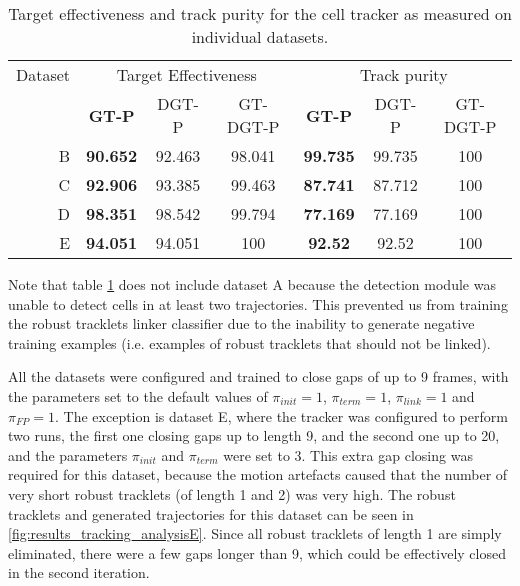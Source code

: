 		\begin{table}[h]
			\centering
			\begin{tabular}{r*{3}{c}*{3}{c}}
				Dataset & \multicolumn{3}{c}{Target Effectiveness} &  \multicolumn{3}{c}{Track purity}   \\
				        &  \textbf{GT-P}  & DGT-P  &   GT-DGT-P    &  \textbf{GT-P}  & DGT-P  & GT-DGT-P \\
			\hline
				      B & \textbf{90.652} & 92.463 &    98.041     & \textbf{99.735} & 99.735 &   100    \\
				      C & \textbf{92.906} & 93.385 &    99.463     & \textbf{87.741} & 87.712 &   100    \\
				      D & \textbf{98.351} & 98.542 &    99.794     & \textbf{77.169} & 77.169 &   100    \\
				      E & \textbf{94.051} & 94.051 &      100      & \textbf{ 92.52} & 92.52  &   100
			\end{tabular} 
			\caption{Target effectiveness and track purity for the cell tracker as measured on individual datasets.}
			\label{tab:results_tracker_individual}
		\end{table}
		
		Note that table \cref{tab:results_tracker_individual} does not include dataset A because the detection module was unable to detect cells in at least two trajectories. This prevented us from training the robust tracklets linker classifier due to the inability to generate negative training examples (i.e. examples of robust tracklets that should not be linked).
		
		All the datasets were configured and trained to close gaps of up to 9 frames, with the parameters set to the default values of $\pi_{init}=1$, $\pi_{term}=1$, $\pi_{link}=1$ and $\pi_{FP}=1$. The exception is dataset E, where the tracker was configured to perform two runs, the first one closing gaps up to length 9, and the second one up to 20, and the parameters $\pi_{init}$ and $\pi_{term}$ were set to 3. This extra gap closing was required for this dataset, because the motion artefacts caused that the number of very short robust tracklets (of length 1 and 2) was very high. The robust tracklets and generated trajectories for this dataset can be seen in \cref{fig:results_tracking_analysisE}. Since all robust tracklets of length 1 are simply eliminated, there were a few gaps longer than 9, which could be effectively closed in the second iteration.
		
